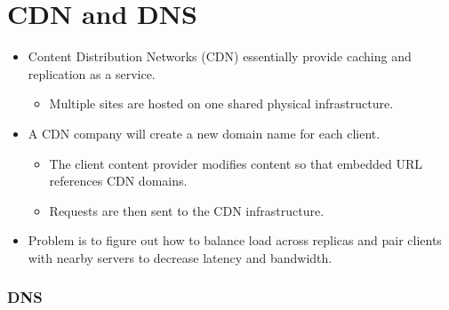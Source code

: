 \documentclass[]{article}
\providecommand{\tightlist}{%
  \setlength{\itemsep}{0pt}\setlength{\parskip}{0pt}}
\begin{document}
\hypertarget{cdn-and-dns}{%
\section{CDN and DNS}\label{cdn-and-dns}}

\begin{itemize}
\tightlist
\item
  Content Distribution Networks (CDN) essentially provide caching and
  replication as a service.

  \begin{itemize}
  \tightlist
  \item
    Multiple sites are hosted on one shared physical infrastructure.
  \end{itemize}
\item
  A CDN company will create a new domain name for each client.

  \begin{itemize}
  \tightlist
  \item
    The client content provider modifies content so that embedded URL
    references CDN domains.
  \item
    Requests are then sent to the CDN infrastructure.
  \end{itemize}
\item
  Problem is to figure out how to balance load across replicas and pair
  clients with nearby servers to decrease latency and bandwidth.
\end{itemize}

\hypertarget{dns}{%
\subsubsection{DNS}\label{dns}}
\end{document}
